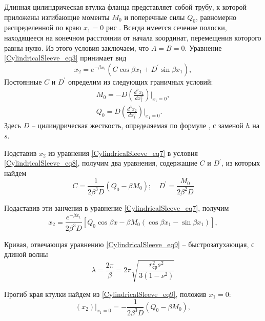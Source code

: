 Длинная цилиндрическая втулка фланца представляет собой трубу, к которой приложены изгибающие моменты $M_0$ и поперечные силы $Q_0$, равномерно распределенной по краю $x_1=0$ рис . 
Всегда имеется сечение полоски, находящееся на конечном расстоянии от начала координат, перемещения которого равны нулю.
Из этого условия заключаем, что $A=B=0$. Уравнение \eqref{CylindricalSleeve_eq3} принимает вид
\begin{equation}
  \label{CylindricalSleeve_eq7}
  x_2= e^{-\beta x_1} \left( C \cos{\beta x_1} +D^{\prime} \sin {\beta x_1} \right),  
\end{equation}
Постоянные $C$ и $D^{\prime}$ определим из следующих граничных условий:
\begin{equation}
  \label{CylindricalSleeve_eq8}
  \begin{split}
    M_0=-D \left( \frac{d^2 x_2}{dx_1^2} \right) \bigg|_{x_1=0},\\
    Q_0=D \left( \frac{d^3 x_2}{dx_1^3} \right) \bigg|_{x_1=0}.
  \end{split} 
\end{equation}
Здесь $D$ -- цилиндрическая жесткость, определяемая по формуле , с заменой $h$ на $s$.

Подставив $x_2$ из уравнения \eqref{CylindricalSleeve_eq7} в условия \eqref{CylindricalSleeve_eq8}, получим два уравнения, содержащие $C$ и $D^{\prime}$, из которых найдем
\begin{equation*}
    C=\frac{1}{2 {\beta}^3 D} \left( Q_0 - \beta M_0 \right); \quad D^{\prime}=\frac{M_0}{2 {\beta}^2 D}
\end{equation*}

Подаставив эти занчения в уравнение \eqref{CylindricalSleeve_eq7}, получим 
\begin{equation}
  \label{CylindricalSleeve_eq9}
  x_2= \frac{e^{-\beta x_1}}{2 {\beta}^3 D} \left[ Q_0 \cos{\beta x} - \beta M_0 \left( \cos{\beta x_1}-\sin{\beta x_1} \right) \right],  
\end{equation}

Кривая, отвечающая уравнению \eqref{CylindricalSleeve_eq9} -- быстрозатухающая, с длиной волны 
\begin{equation}
  \label{CylindricalSleeve_eq10}
  \lambda=\frac{2 \pi}{\beta}=2 \pi \sqrt{\frac{r_{\text{ср}}^2 s^2}{3 \left( 1- {\nu}^2 \right)}}   
\end{equation}

Прогиб края ктулки найдем из \eqref{CylindricalSleeve_eq9}, положив $x_1=0$:
\begin{equation}
  \label{CylindricalSleeve_eq11}
  (x_2)|_{x_1=0}= -\frac{1}{2 {\beta}^3 D} \left( Q_0 - \beta M_0 \right),  
\end{equation}

